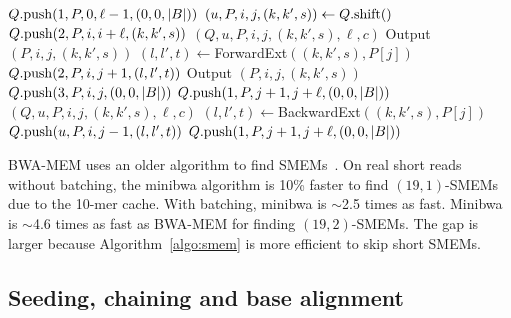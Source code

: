 \documentclass[webpdf,contemporary,large,namedate]{oup-authoring-template}%
\begin{document}
\begin{algorithm}[tb]
	\caption{Find $(\ell,c)$-SMEMs in string set $\mathcal{P}$}\label{algo:smem}
	\begin{algorithmic}[1]
					\State $Q.{\rm push}(1,P,0,\ell-1,(0,0,|B|))$
				\EndIf
			\EndFor
				\State $(u,P,i,j,(k,k',s))\gets Q.{\rm shift}()$
						\State $Q.{\rm push}(2,P,i,i+\ell,(k,k',s))$
					\Else
						$(Q,u,P,i,j,(k,k',s),\ell,c)$
					\EndIf
						\State Output $(P,i,j,(k,k',s))$
					\EndIf
					\State $(l,l',t)\gets${\sc ForwardExt}$((k,k',s),P[j])$
						\State $Q.{\rm push}(2,P,i,j+1,(l,l',t))$
					\Else{}
						\State Output $(P,i,j,(k,k',s))$
						\State $Q.{\rm push}(3,P,i,j,(0,0,|B|))$
					\EndIf
						\State $Q.{\rm push}(1,P,j+1,j+\ell,(0,0,|B|))$
					\Else
						$(Q,u,P,i,j,(k,k',s),\ell,c)$
					\EndIf
				\EndIf
			\EndWhile
		\EndFunction
			\State $(l,l',t)\gets${\sc BackwardExt}$((k,k',s),P[j])$
				\State $Q.{\rm push}(u,P,i,j-1,(l,l',t))$
				\State $Q.{\rm push}(1,P,j+1,j+\ell,(0,0,|B|))$
			\EndIf
		\EndFunction
	\end{algorithmic}
\end{algorithm}

BWA-MEM uses an older algorithm to find SMEMs~\citep{Li:2012fk}.
On real short reads without batching, the minibwa algorithm is 10\% faster to find $(19,1)$-SMEMs due to the 10-mer cache.
With batching, minibwa is $\sim$2.5 times as fast.
Minibwa is $\sim$4.6 times as fast as BWA-MEM for finding $(19,2)$-SMEMs.
The gap is larger because Algorithm~\ref{algo:smem} is more efficient to skip short SMEMs.

\subsection{Seeding, chaining and base alignment}\label{sec:align}
\end{document}
